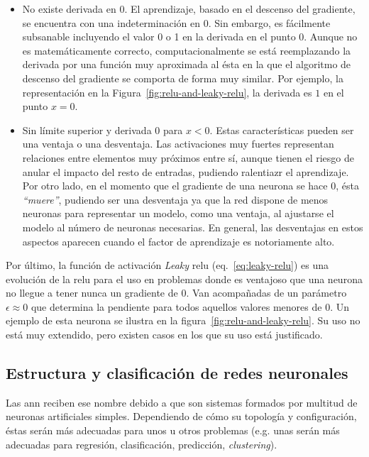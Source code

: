 \begin{itemize}
	\item No existe derivada en $0$. El aprendizaje, basado en el descenso del gradiente, se encuentra con una indeterminación en $0$. Sin embargo, es fácilmente subsanable incluyendo el valor 0 o 1 en la derivada en el punto 0. Aunque no es  matemáticamente correcto, computacionalmente se está reemplazando la derivada por una función muy aproximada al ésta en la que el algoritmo de descenso del gradiente se comporta de forma muy similar. Por ejemplo, la representación en la Figura~\ref{fig:relu-and-leaky-relu}, la derivada es $1$ en el punto $x = 0$.
	\item Sin límite superior y derivada $0$ para $x < 0$. Estas características pueden ser una ventaja o una desventaja. Las activaciones muy fuertes representan relaciones entre elementos muy próximos entre sí, aunque tienen el riesgo de anular el impacto del resto de entradas, pudiendo ralentiazr el aprendizaje. Por otro lado, en el momento que el gradiente de una neurona se hace 0, ésta \textit{\enquote{muere}}, pudiendo ser una desventaja ya que la red dispone de menos neuronas para representar un modelo, como una ventaja, al ajustarse el modelo al número de neuronas necesarias. En general, las desventajas en estos aspectos aparecen cuando el factor de aprendizaje es notoriamente alto.
\end{itemize}

Por último, la función de activación \textit{Leaky} \gls{relu} (eq.~\ref{eq:leaky-relu}) es una evolución de la \gls{relu} para el uso en problemas donde es ventajoso que una neurona no llegue a tener nunca un gradiente de 0. Van acompañadas de un parámetro $\epsilon \approx 0$ que determina la pendiente para todos aquellos valores menores de 0. Un ejemplo de esta neurona se ilustra en la figura~\ref{fig:relu-and-leaky-relu}. Su uso no está muy extendido, pero existen casos en los que su uso está justificado.

\subsection{Estructura y clasificación de redes neuronales}

Las \gls{ann} reciben ese nombre debido a que son sistemas formados por multitud de neuronas artificiales simples. Dependiendo de cómo su topología y configuración, éstas serán más adecuadas para unos u otros problemas (e.g. unas serán más adecuadas para regresión, clasificación, predicción, \textit{clustering}).

